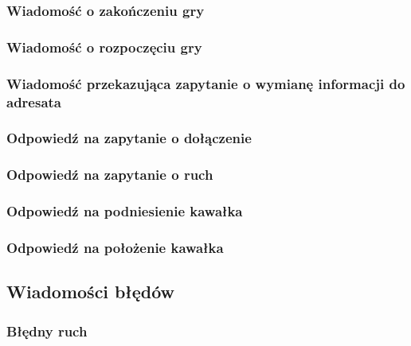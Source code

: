 \documentclass[Dokumentacja.tex]{subfiles}
\begin{document}
\subsubsection{Wiadomość o zakończeniu gry}


\subsubsection{Wiadomość o rozpoczęciu gry}


\subsubsection{Wiadomość przekazująca zapytanie o wymianę informacji do adresata}


\subsubsection{Odpowiedź na zapytanie o dołączenie}


\subsubsection{Odpowiedź na zapytanie o ruch}


\subsubsection{Odpowiedź na podniesienie kawałka}


\subsubsection{Odpowiedź na położenie kawałka}


\subsection{Wiadomości błędów}

\subsubsection{Błędny ruch}

\end{document}
